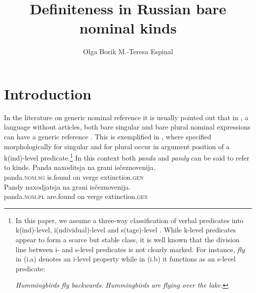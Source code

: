 \documentclass[output=paper
,modfonts
,nonflat]{langsci/langscibook}
\title{Definiteness in Russian bare nominal kinds}
\author{%
	Olga Borik\affiliation{Universidad Nacional de Educación a Distancia}\lastand 
	M.-Teresa Espinal\affiliation{Universitat Autònoma de Barcelona}
}
\begin{document}
	
	
	
	\maketitle
	\section{Introduction} \label{sec:borik:1}
	In the literature on generic nominal reference it is usually pointed out that in , a language without articles, both bare singular and bare plural nominal expressions can have a generic reference \citep{Chierchia1998,Doron2003,Dayal2004}. This is exemplified in , where  specified morphologically for singular  and for plural  occur in argument position of a k(ind)-level predicate.\footnote{In this paper, we assume a three-way classification of verbal predicates into k(ind)-level, i(ndividual)-level and s(tage)-level \citep{Carlson1977}. While k-level predicates appear to form a scarce but stable class, it is well known that the division line between i- and s-level predicates is not clearly marked. For instance, \textit{fly} in (i.a) denotes an i-level property while in (i.b) it functions as an s-level predicate: 
		
	\ea\label{ex:borik:i}
		\ea\label{ex:borik:ia} \textit{Hummingbirds fly backwards.}
		\ex\label{ex:borik:ib} \textit{Hummingbirds are flying over the lake.}
		\z
	\z}
	\newpage
	In this context both \textit{panda} and \textit{pandy} can be said to refer to kinds. 
	\ea\label{ex:borik:1}
	\ea\label{ex:borik:1a}{
		\gll Panda naxoditsja		na		grani			is\v{c}eznovenija.\\ 
		panda.\textsc{nom.sg} is.found on verge extinction.\textsc{gen}\\
	}
	\ex\label{ex:borik:1b}{
		\gll Pandy		naxodjatsja	na	grani	is\v{c}eznovenija. \\
		panda.\textsc{nom.pl} 	are.found 	on	verge	extinction.\textsc{gen}\\
	}
	\z
	\z
	
\end{document}
